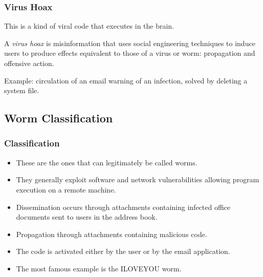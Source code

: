 \documentclass{beamer}
\newcommand{\enlight}[1]{\textit{\color{blue}#1}}
\begin{document}
\begin{frame}
\frametitle{Virus Hoax}

This is a kind of viral code that executes in the brain.
\bigskip

\begin{definition}\begin{itshape}
A \enlight{virus hoax} is misinformation that uses social engineering techniques to induce users to produce effects equivalent to those of a virus or worm: propagation and offensive action.
\end{itshape}
\end{definition}

\bigskip
{\color{blue} Example:} circulation of an email warning of an infection, solved by deleting a system file.

\end{frame}




\subsection{Worm Classification}


\begin{frame}
  \frametitle{Classification}
\begin{itemize}
\item These are the ones that can legitimately be called worms.
\item They generally exploit software and network vulnerabilities allowing program execution on a remote machine.
\end{itemize}
\begin{itemize}
\item Dissemination occurs through attachments containing infected office documents sent to users in the address book.
\end{itemize}
\begin{itemize}
\item Propagation through attachments containing malicious code.
\item The code is activated either by the user or by the email application.
  \item The most famous example is the ILOVEYOU worm.
  \end{itemize}
\end{frame}
\end{document}
